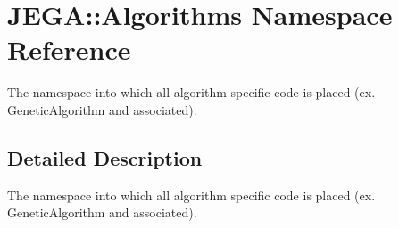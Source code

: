 \hypertarget{namespaceJEGA_1_1Algorithms}{}\section{J\+E\+GA\+:\+:Algorithms Namespace Reference}
\label{namespaceJEGA_1_1Algorithms}


The namespace into which all algorithm specific code is placed (ex. Genetic\+Algorithm and associated).  




\subsection{Detailed Description}
The namespace into which all algorithm specific code is placed (ex. Genetic\+Algorithm and associated). 
